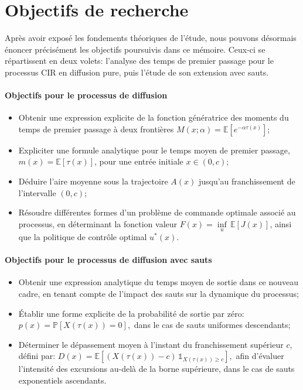 \section{Objectifs de recherche}  %

Après avoir exposé les fondements théoriques de l'étude, nous pouvons désormais énoncer précisément les objectifs poursuivis dans ce mémoire. Ceux-ci se répartissent en deux volets: l'analyse des temps de premier passage pour le processus \acs{CIR} en diffusion pure, puis l'étude de son extension avec sauts.
\paragraph{Objectifs pour le processus de diffusion}
\begin{itemize}
    \item Obtenir une expression explicite de la fonction génératrice des moments du temps de premier passage à deux frontières \( M(x;\alpha) = \mathds{E}[e^{-\alpha \tau(x)}] \);
    \item Expliciter une formule analytique pour le temps moyen de premier passage, \( m(x) = \mathds{E}[\tau(x)] \), pour une entrée initiale \( x \in (0,c) \);
    \item Déduire l'aire moyenne sous la trajectoire $A(x)$ jusqu'au franchissement de l'intervalle \( (0,c) \);
    \item Résoudre différentes formes d'un problème de commande optimale associé au processus, en déterminant la fonction valeur \( F(x) = \underset{u}{\inf}\,\mathds{E}[J(x)] \), ainsi que la politique de contrôle optimal $u^*(x)$.
\end{itemize}
\paragraph{Objectifs pour le processus de diffusion avec sauts}
\begin{itemize}
    \item Obtenir une expression analytique du temps moyen de sortie dans ce nouveau cadre, en tenant compte de l'impact des sauts sur la dynamique du processus;
    \item Établir une forme explicite de la probabilité de sortie par zéro:
    \(
    p(x) = \mathds{P}[X(\tau(x)) = 0],
    \)
    dans le cas de sauts uniformes descendants;
    \item Déterminer le dépassement moyen à l'instant du franchissement supérieur \( c \), défini par:
    \(
    D(x) = \mathds{E}[(X(\tau(x)) - c)\, \mathds{1}_{X(\tau(x)) \geq c}],
    \)
    afin d'évaluer l'intensité des excursions au-delà de la borne supérieure, dans le cas de sauts exponentiels ascendants.
\end{itemize}


